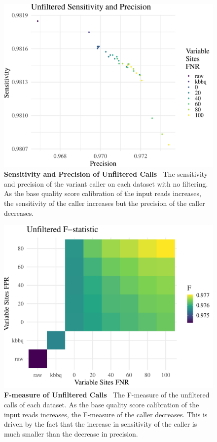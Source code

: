 \documentclass{report}
\newcommand{\titlecaption}[2]{\caption[#1]{\textbf{#1 \textbar\,} #2}}
\begin{document}
\begin{figure}
\centering
\includegraphics[width = .8\textwidth]{sens_precision.pdf}
\titlecaption{Sensitivity and Precision of Unfiltered Calls}{The sensitivity and precision of the variant caller on each dataset with no filtering. As the base quality score calibration of the input reads increases, the sensitivity of the caller increases but the precision of the caller decreases.}
\label{fig:vc_sens_prec}
\end{figure}

\begin{figure}
\centering
\includegraphics[width = .8\textwidth]{f_heatmap.pdf}
\titlecaption{F-measure of Unfiltered Calls}{The F-measure of the unfiltered calls of each dataset. As the base quality score calibration of the input reads increases, the F-measure of the caller decreases. This is driven by the fact that the increase in sensitivity of the caller is much smaller than the decrease in precision.}
\label{fig:vc_f_heatmap}
\end{figure}
\end{document}
